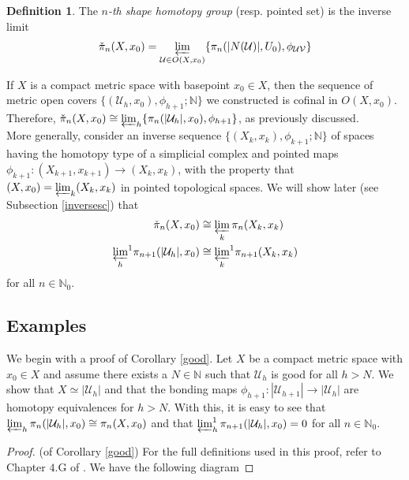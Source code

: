 \documentclass[a4paper,11pt]{article}
\theoremstyle{definition}
\newtheorem{definition}{Definition}[section]
\theoremstyle{plain}
\theoremstyle{remark}
\begin{document}
{\begin{definition} \label{defcech} The \textit{$n$-th shape homotopy group} (resp. pointed set) is the inverse limit 
\begin{align*}
\check{\pi}_{n}(X,x_{0}) = \varprojlim_{\mathcal{U}\in O(X,x_{0})} \{\pi_{n}(|N(\mathcal{U})|, U_{0}), \phi_{\mathcal{U}\mathcal{V}}\}
\end{align*}
\end{definition}

If $X$ is a compact metric space with basepoint $x_{0}\in X$, then the sequence of metric open covers $\{(\mathcal{U}_{h},x_{0}), \phi_{h+1}; \mathbb{N}\}$ we constructed is cofinal in $O(X,x_{0})$. Therefore, $\check{\pi}_{n}(X,x_{0}) \cong \varprojlim_{h} \{\pi_{n}(|\mathcal{U}_{h}|, x_0), \phi_{h+1}\}$, as previously discussed.\\

More generally, consider an inverse sequence $\{(X_{k},x_{k}),\phi_{k+1};\mathbb{N}\}$ of spaces having the homotopy type of a simplicial complex and pointed maps $\phi_{k+1}: (X_{k+1},x_{k+1})\rightarrow (X_{k},x_{k})$, with the property that $(X,x_0) = \varprojlim_{k} (X_{k},x_{k})$ in pointed topological spaces. We will show later (see Subsection \ref{inversesc}) that 
\begin{align*}
\check{\pi}_{n}(X,x_{0}) &\cong \varprojlim_{k} \pi_{n}(X_{k}, x_k)\\
{\varprojlim_h}^1 \pi_{n+1}(|\mathcal{U}_{h}|,x_0) &\cong {\varprojlim_k}^1 \pi_{n+1}(X_{k}, x_k)
\end{align*}
for all $n\in \mathbb{N}_{0}$.

\subsection{Examples} \label{goodexamples}

We begin with a proof of Corollary \ref{good}. Let $X$ be a compact metric space with $x_{0}\in X$ and assume there exists a $N\in \mathbb{N}$ such that $\mathcal{U}_{h}$ is good for all $h>N$. We show that $X\simeq |\mathcal{U}_{h}|$ and that the bonding maps $\phi_{h+1}: |\mathcal{U}_{h+1}|\rightarrow |\mathcal{U}_{h}|$ are homotopy equivalences for $h>N$. With this, it is easy to see that $\varprojlim_{h} \pi_{n}(|\mathcal{U}_{h}|,x_0) \cong \pi_{n}(X,x_0)$ and that $\varprojlim^1_{h}\pi_{n+1}(|\mathcal{U}_{h}|,x_0) = 0$ for all $n\in \mathbb{N}_{0}$.

\begin{proof} (of Corollary \ref{good}) For the full definitions used in this proof, refer to Chapter $4.$G of \cite{hatcher2002algebraic}. We have the following diagram



\end{proof}}
\end{document}
